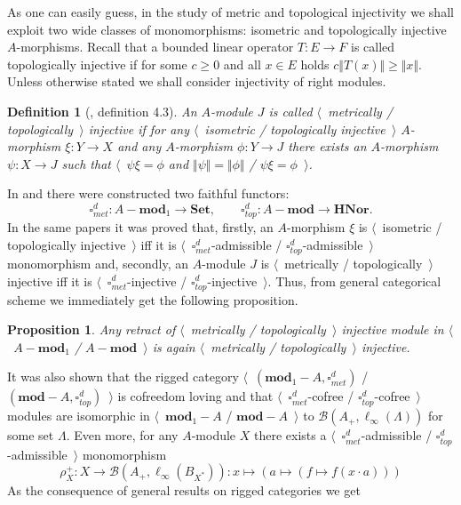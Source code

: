 \documentclass[12pt]{article}
\newtheorem{proposition}[theorem]{Proposition}
\newtheorem{definition}[theorem]{Definition}
\begin{document}
As one can easily guess, in the study of metric and topological injectivity we shall exploit two wide classes of monomorphisms: isometric and topologically injective $A$-morphisms. Recall that a bounded linear operator $T:E\to F$ is called topologically injective if for some $c\geq 0$ and all $x\in E$ holds $c\Vert T(x)\Vert\geq \Vert x\Vert$. Unless otherwise stated we shall consider injectivity of right modules.

\begin{definition}[\cite{HelMetrFrQMod}, definition 4.3]\label{MetTopInjMod} An $A$-module $J$ is called $\langle$~metrically / topologically~$\rangle$ injective if for any $\langle$~isometric / topologically injective~$\rangle$ $A$-morphism $\xi:Y\to X$ and any $A$-morphism $\phi:Y\to J$ there exists an $A$-morphism $\psi:X\to J$ such that $\langle$~$\psi\xi=\phi$  and $\Vert\psi\Vert=\Vert\phi\Vert$ / $\psi\xi=\phi$~$\rangle$.
\end{definition}

In \cite{HelMetrFrQMod} and \cite{ShtTopFrClassicQuantMod} there were constructed two faithful functors:
$$
\square_{met}^d:A-\mathbf{mod}_1\to\mathbf{Set},
\qquad
\square_{top}^d:A-\mathbf{mod}\to\mathbf{HNor}.
$$
In the same papers it was proved that, firstly, an $A$-morphism $\xi$ is $\langle$~isometric / topologically injective~$\rangle$ iff it is $\langle$~$\square_{met}^d$-admissible / $\square_{top}^d$-admissible~$\rangle$ monomorphism and, secondly, an $A$-module $J$ is $\langle$~metrically / topologically~$\rangle$ injective iff it is $\langle$~$\square_{met}^d$-injective / $\square_{top}^d$-injective~$\rangle$. Thus, from general categorical scheme we immediately get the following proposition.

\begin{proposition}\label{RetrMetTopInjIsMetTopInj} Any retract of $\langle$~metrically / topologically~$\rangle$ injective module in $\langle$~$A-\mathbf{mod}_1$ / $A-\mathbf{mod}$~$\rangle$ is again $\langle$~metrically / topologically~$\rangle$ injective.
\end{proposition}

It was also shown that the rigged category $\langle$~$(\mathbf{mod}_1-A,\square_{met}^d)$ / $(\mathbf{mod}-A,\square_{top}^d)$~$\rangle$ is cofreedom loving and that $\langle$~$\square_{met}^d$-cofree / $\square_{top}^d$-cofree~$\rangle$ modules are isomorphic in $\langle$~$\mathbf{mod}_1-A$ / $\mathbf{mod}-A$~$\rangle$ to $\mathcal{B}(A_+, \ell_\infty(\Lambda))$ for some set $\Lambda$. Even more, for any $A$-module $X$ there exists a $\langle$~$\square_{met}^d$-admissible / $\square_{top}^d$-admissible~$\rangle$ monomorphism
$$
\rho_X^+:X\to\mathcal{B}(A_+,\ell_\infty(B_{X^*})):x\mapsto(a\mapsto(f\mapsto f(x\cdot a)))
$$
As the consequence of general results on rigged categories we get
\end{document}
